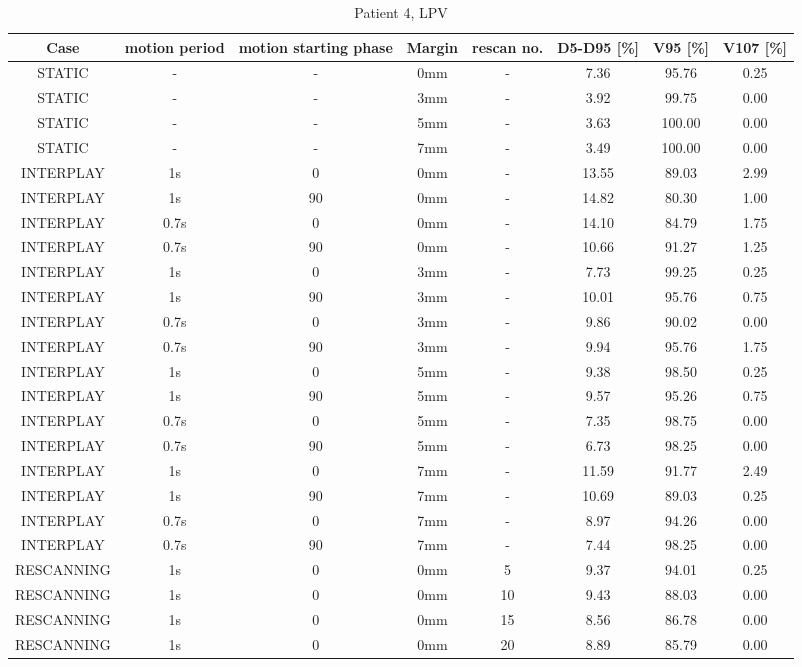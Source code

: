 \begin{table}[H]
  \centering
  \tiny
  \caption{Patient 4, LPV}
  \begin{tabular}{|c||c|c|c|c||c|c|c|}
    \hline\hline
    Case & motion period & motion starting phase & Margin & rescan no. & D5-D95 [\%] & V95 [\%] & V107 [\%] \\
    \hline 
STATIC & - & - & 0mm & - & 7.36 & 95.76 & 0.25 \\
STATIC & - & - & 3mm & - & 3.92 & 99.75 & 0.00 \\
STATIC & - & - & 5mm & - & 3.63 & 100.00 & 0.00 \\
STATIC & - & - & 7mm & - & 3.49 & 100.00 & 0.00 \\
INTERPLAY & 1s & 0 & 0mm & - & 13.55 & 89.03 & 2.99 \\
INTERPLAY & 1s & 90 & 0mm & - & 14.82 & 80.30 & 1.00 \\
INTERPLAY & 0.7s & 0 & 0mm & - & 14.10 & 84.79 & 1.75 \\
INTERPLAY & 0.7s & 90 & 0mm & - & 10.66 & 91.27 & 1.25 \\
INTERPLAY & 1s & 0 & 3mm & - & 7.73 & 99.25 & 0.25 \\
INTERPLAY & 1s & 90 & 3mm & - & 10.01 & 95.76 & 0.75 \\
INTERPLAY & 0.7s & 0 & 3mm & - & 9.86 & 90.02 & 0.00 \\
INTERPLAY & 0.7s & 90 & 3mm & - & 9.94 & 95.76 & 1.75 \\
INTERPLAY & 1s & 0 & 5mm & - & 9.38 & 98.50 & 0.25 \\
INTERPLAY & 1s & 90 & 5mm & - & 9.57 & 95.26 & 0.75 \\
INTERPLAY & 0.7s & 0 & 5mm & - & 7.35 & 98.75 & 0.00 \\
INTERPLAY & 0.7s & 90 & 5mm & - & 6.73 & 98.25 & 0.00 \\
INTERPLAY & 1s & 0 & 7mm & - & 11.59 & 91.77 & 2.49 \\
INTERPLAY & 1s & 90 & 7mm & - & 10.69 & 89.03 & 0.25 \\
INTERPLAY & 0.7s & 0 & 7mm & - & 8.97 & 94.26 & 0.00 \\
INTERPLAY & 0.7s & 90 & 7mm & - & 7.44 & 98.25 & 0.00 \\
RESCANNING & 1s & 0 & 0mm & 5 & 9.37 & 94.01 & 0.25 \\
RESCANNING & 1s & 0 & 0mm & 10 & 9.43 & 88.03 & 0.00 \\
RESCANNING & 1s & 0 & 0mm & 15 & 8.56 & 86.78 & 0.00 \\
RESCANNING & 1s & 0 & 0mm & 20 & 8.89 & 85.79 & 0.00 \\

\end{tabular}
\end{table}
